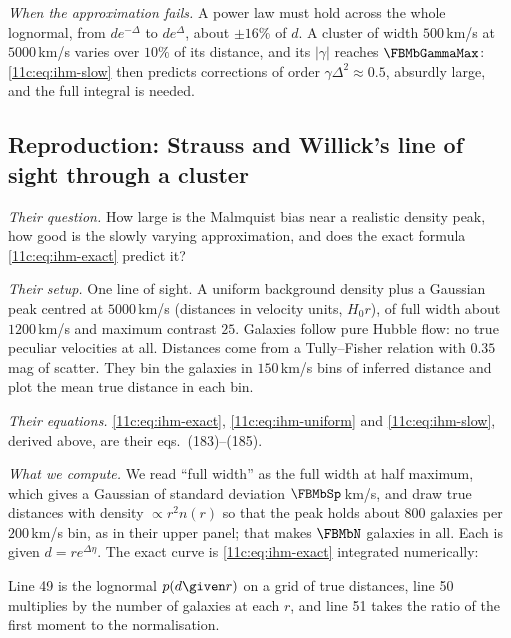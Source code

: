 \emph{When the approximation fails.} A power law must hold across the whole
lognormal, from $de^{-\Delta}$ to $de^{\Delta}$, about $\pm16\%$ of $d$. A cluster of
width $500$\,km/s at $5000$\,km/s varies over $10\%$ of its distance, and its
$|\gamma|$ reaches $\FBMbGammaMax$: \eqref{11c:eq:ihm-slow} then predicts corrections of
order $\gamma\Delta^2\approx0.5$, absurdly large, and the full integral is needed.

\subsection{Reproduction: Strauss and Willick's line of sight through a cluster}
\label{11c:sec:sw-repro}

\emph{Their question.} How large is the Malmquist bias near a realistic density
peak, how good is the slowly varying approximation, and does the exact formula
\eqref{11c:eq:ihm-exact} predict it? \cite[Sec.~6.5.2, Fig.~15]{StraussWillick1995}

\emph{Their setup.} One line of sight. A uniform background density plus a Gaussian
peak centred at $5000$\,km/s (distances in velocity units, $H_0r$), of full width about
$1200$\,km/s and maximum contrast $25$. Galaxies follow pure Hubble flow: no true
peculiar velocities at all. Distances come from a Tully--Fisher relation with
$0.35$\,mag of scatter. They bin the galaxies in $150$\,km/s bins of inferred distance
and plot the mean true distance in each bin.

\emph{Their equations.} \eqref{11c:eq:ihm-exact}, \eqref{11c:eq:ihm-uniform} and
\eqref{11c:eq:ihm-slow}, derived above, are their eqs.~(183)--(185).

\emph{What we compute.} We read ``full width'' as the full width at half maximum,
which gives a Gaussian of standard deviation $\FBMbSp$\,km/s, and draw true
distances with density $\propto r^2n(r)$ so that the peak holds about $800$
galaxies per $200$\,km/s bin, as in their upper panel; that makes $\FBMbN$ galaxies in
all. Each is given $d=re^{\Delta\eta}$. The exact curve is \eqref{11c:eq:ihm-exact}
integrated numerically:


\noindent Line 49 is the lognormal $p(d\given r)$ on a grid of true distances, line 50
multiplies by the number of galaxies at each $r$, and line 51 takes the ratio of the
first moment to the normalisation.

